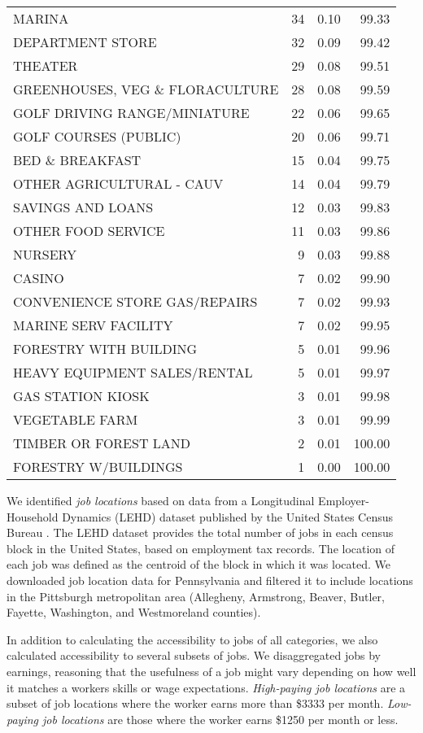 \documentclass[
]{book}
\theoremstyle{definition}
\theoremstyle{definition}
\theoremstyle{definition}
\theoremstyle{definition}
\theoremstyle{remark}
\begin{document}
\begin{table}
\begin{tabular}[t]{lrrr}
MARINA & 34 & 0.10 & 99.33\\
DEPARTMENT STORE & 32 & 0.09 & 99.42\\
THEATER & 29 & 0.08 & 99.51\\
GREENHOUSES, VEG \& FLORACULTURE & 28 & 0.08 & 99.59\\
\addlinespace
GOLF DRIVING RANGE/MINIATURE & 22 & 0.06 & 99.65\\
GOLF COURSES (PUBLIC) & 20 & 0.06 & 99.71\\
BED \& BREAKFAST & 15 & 0.04 & 99.75\\
OTHER AGRICULTURAL - CAUV & 14 & 0.04 & 99.79\\
SAVINGS AND LOANS & 12 & 0.03 & 99.83\\
\addlinespace
OTHER FOOD SERVICE & 11 & 0.03 & 99.86\\
NURSERY & 9 & 0.03 & 99.88\\
CASINO & 7 & 0.02 & 99.90\\
CONVENIENCE STORE GAS/REPAIRS & 7 & 0.02 & 99.93\\
MARINE SERV FACILITY & 7 & 0.02 & 99.95\\
\addlinespace
FORESTRY WITH BUILDING & 5 & 0.01 & 99.96\\
HEAVY EQUIPMENT SALES/RENTAL & 5 & 0.01 & 99.97\\
GAS STATION KIOSK & 3 & 0.01 & 99.98\\
VEGETABLE FARM & 3 & 0.01 & 99.99\\
TIMBER OR FOREST LAND & 2 & 0.01 & 100.00\\
\addlinespace
FORESTRY W/BUILDINGS & 1 & 0.00 & 100.00\\
\bottomrule
\end{tabular}
\end{table}

We identified \emph{job locations} based on data from a Longitudinal
Employer-Household Dynamics (LEHD) dataset published by the United States Census
Bureau \citep{united_states_census_bureau_lehd_2021}. The LEHD dataset provides the
total number of jobs in each census block in the United States, based on
employment tax records. The location of each job was defined as the centroid of
the block in which it was located. We downloaded job location data for
Pennsylvania and filtered it to include locations in the Pittsburgh metropolitan
area (Allegheny, Armstrong, Beaver, Butler, Fayette, Washington, and
Westmoreland counties).

In addition to calculating the accessibility to jobs of all categories, we also
calculated accessibility to several subsets of jobs. We disaggregated jobs by
earnings, reasoning that the usefulness of a job might vary depending on how
well it matches a workers skills or wage expectations. \emph{High-paying job locations}
are a subset of job locations where the worker earns more than \$3333 per month.
\emph{Low-paying job locations} are those where the worker earns \$1250 per month or less.
\end{document}
